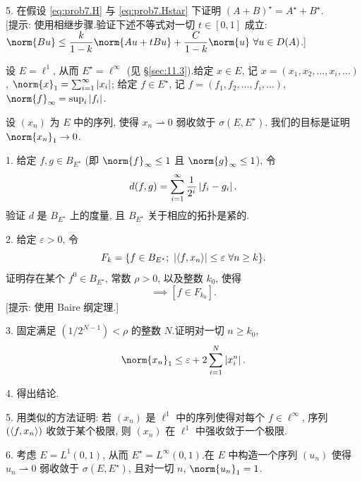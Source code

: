 \begin{problem}[第 1, 2 章]
5. 在假设 \eqref{eq:prob7.H} 与 \eqref{eq:prob7.Hstar} 下证明
$(A+B)^\star=A^\star+B^\star$.\\
{[提示: 使用相继步骤.验证下述不等式对一切 $t\in[0,1]$ 成立:
$\norm{Bu}\le\dfrac{k}{1-k}\norm{Au+tBu}+\dfrac{C}{1-k}\norm{u}\ \forall u\in D(A)$.]}
\end{problem}

\begin{problem}
\label{prob:8}
设 $E=\ell^1$, 从而 $E^\star=\ell^\infty$ (见 \S \ref{sec:11.3}).给定 $x\in E$,
记 $x=(x_1,x_2,\dots,x_i,\dots)$, $\norm{x}_1=\sum_{i=1}^\infty\abs{x_i}$;
给定 $f\in E^\star$, 记 $f=(f_1,f_2,\dots,f_i,\dots)$,
$\norm{f}_\infty=\sup_i\abs{f_i}$.

设 $(x_n)$ 为 $E$ 中的序列, 使得 $x_n\rightharpoonup0$ 弱收敛于 $\sigma(E,E^\star)$.
我们的目标是证明 $\norm{x_n}_1\to0$.

1. 给定 $f,g\in B_{E^\star}$ (即 $\norm{f}_\infty\le1$ 且 $\norm{g}_\infty\le1$), 令
\begin{equation*}
d(f,g)=\sum_{i=1}^\infty\frac{1}{2^i}\left|f_i-g_i\right|.
\end{equation*}
验证 $d$ 是 $B_{E^\star}$ 上的度量, 且 $B_{E^\star}$ 关于相应的拓扑是紧的.

2. 给定 $\varepsilon>0$, 令
\begin{equation*}
F_k=\{f\in B_{E^\star};\ \abs{\dual{f}{x_n}}\le\varepsilon\ \forall n\ge k\}.
\end{equation*}
证明存在某个 $f^0\in B_{E^\star}$, 常数 $\rho>0$, 以及整数 $k_0$, 使得
\begin{equation*}
[f\in B_{E^\star}\ \text{且}\ d(f,f^0)<\rho]\implies[f\in F_{k_0}].
\end{equation*}
[提示: 使用 Baire 纲定理.]

3. 固定满足 $(1/2^{N-1})<\rho$ 的整数 $N$.证明对一切 $n\ge k_0$,
\begin{equation*}
\norm{x_n}_1\le\varepsilon+2\sum_{i=1}^N\abs{x_i^n}.
\end{equation*}

4. 得出结论.

5. 用类似的方法证明: 若 $(x_n)$ 是 $\ell^1$ 中的序列使得对每个 $f\in\ell^\infty$,
序列 $(\left\langle f,x_n\right\rangle)$ 收敛于某个极限, 则 $(x_n)$ 在 $\ell^1$ 中强收敛于一个极限.

6. 考虑 $E=L^1(0,1)$, 从而 $E^\star=L^\infty(0,1)$.在 $E$ 中构造一个序列
$(u_n)$ 使得 $u_n\rightharpoonup0$ 弱收敛于 $\sigma(E,E^\star)$, 且对一切 $n$,
$\norm{u_n}_1=1$.
\end{problem}

